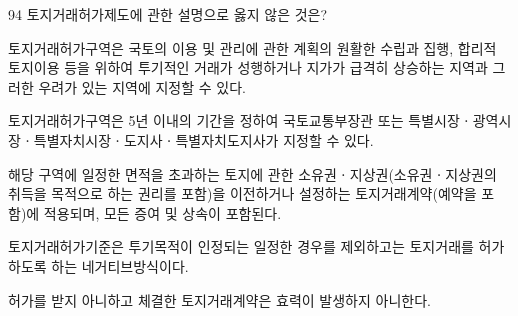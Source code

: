 \begin{question}{94}
토지거래허가제도에 관한 설명으로 옳지 않은 것은?
\begin{choices}
  \item 토지거래허가구역은 국토의 이용 및 관리에 관한 계획의 원활한 수립과 집행, 합리적 토지이용 등을 위하여 투기적인 거래가 성행하거나 지가가 급격히 상승하는 지역과 그러한 우려가 있는 지역에 지정할 수 있다.
  \item 토지거래허가구역은 5년 이내의 기간을 정하여 국토교통부장관 또는 특별시장ㆍ광역시장ㆍ특별자치시장ㆍ도지사ㆍ특별자치도지사가 지정할 수 있다.
  \item 해당 구역에 일정한 면적을 초과하는 토지에 관한 소유권ㆍ지상권(소유권ㆍ지상권의 취득을 목적으로 하는 권리를 포함)을 이전하거나 설정하는 토지거래계약(예약을 포함)에 적용되며, 모든 증여 및 상속이 포함된다.
  \item 토지거래허가기준은 투기목적이 인정되는 일정한 경우를 제외하고는 토지거래를 허가하도록 하는 네거티브방식이다.
  \item 허가를 받지 아니하고 체결한 토지거래계약은 효력이 발생하지 아니한다.
\end{choices}
\end{question}
